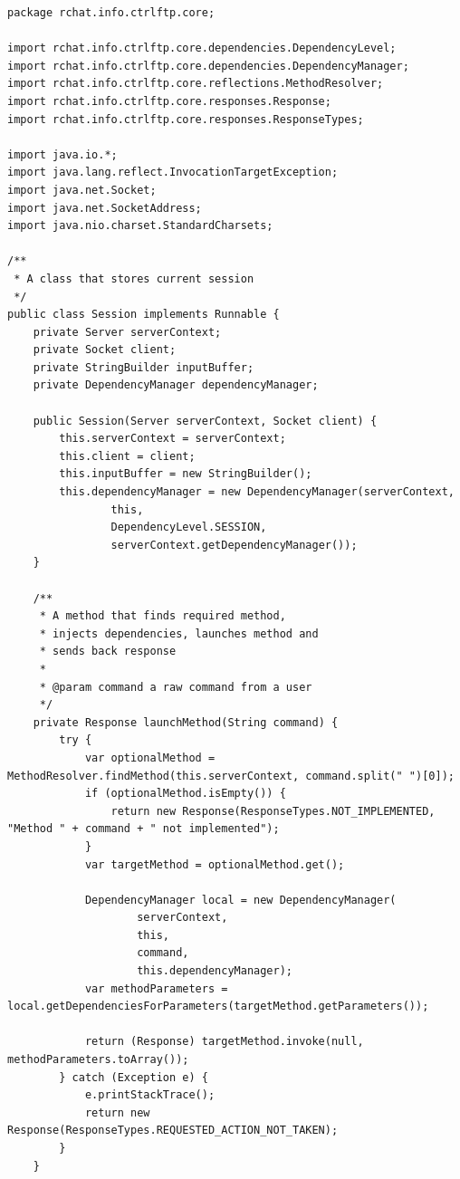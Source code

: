 \documentclass[a4paper,14pt]{extarticle}
\begin{document}
\begin{verbatim}
package rchat.info.ctrlftp.core;

import rchat.info.ctrlftp.core.dependencies.DependencyLevel;
import rchat.info.ctrlftp.core.dependencies.DependencyManager;
import rchat.info.ctrlftp.core.reflections.MethodResolver;
import rchat.info.ctrlftp.core.responses.Response;
import rchat.info.ctrlftp.core.responses.ResponseTypes;

import java.io.*;
import java.lang.reflect.InvocationTargetException;
import java.net.Socket;
import java.net.SocketAddress;
import java.nio.charset.StandardCharsets;

/**
 * A class that stores current session
 */
public class Session implements Runnable {
    private Server serverContext;
    private Socket client;
    private StringBuilder inputBuffer;
    private DependencyManager dependencyManager;

    public Session(Server serverContext, Socket client) {
        this.serverContext = serverContext;
        this.client = client;
        this.inputBuffer = new StringBuilder();
        this.dependencyManager = new DependencyManager(serverContext,
                this,
                DependencyLevel.SESSION,
                serverContext.getDependencyManager());
    }

    /**
     * A method that finds required method,
     * injects dependencies, launches method and
     * sends back response
     *
     * @param command a raw command from a user
     */
    private Response launchMethod(String command) {
        try {
            var optionalMethod = MethodResolver.findMethod(this.serverContext, command.split(" ")[0]);
            if (optionalMethod.isEmpty()) {
                return new Response(ResponseTypes.NOT_IMPLEMENTED, "Method " + command + " not implemented");
            }
            var targetMethod = optionalMethod.get();

            DependencyManager local = new DependencyManager(
                    serverContext,
                    this,
                    command,
                    this.dependencyManager);
            var methodParameters = local.getDependenciesForParameters(targetMethod.getParameters());

            return (Response) targetMethod.invoke(null, methodParameters.toArray());
        } catch (Exception e) {
            e.printStackTrace();
            return new Response(ResponseTypes.REQUESTED_ACTION_NOT_TAKEN);
        }
    }


\end{verbatim}
\end{document}
